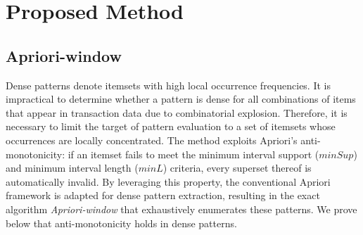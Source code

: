 \section{Proposed Method}
\label{proposed_method}
\subsection{Apriori-window}
Dense patterns denote itemsets with high local occurrence frequencies. 
It is impractical to determine whether a pattern is dense for all combinations of items that appear in transaction data due to combinatorial explosion. 
Therefore, it is necessary to limit the target of pattern evaluation to a set of itemsets whose occurrences are locally concentrated. 
The method exploits Apriori’s anti-monotonicity\cite{agrawal1994fast}: if an itemset fails to meet the minimum interval support ($minSup$) and minimum interval length ($minL$) criteria, every superset thereof is automatically invalid. By leveraging this property, the conventional Apriori framework is adapted for dense pattern extraction, resulting in the exact algorithm \emph{Apriori-window} that exhaustively enumerates these patterns.
We prove below that anti-monotonicity holds in dense patterns.


